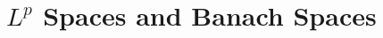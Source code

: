 \documentclass[../../main.tex]{subfiles}
\begin{document}
\chapter{\(L^p\) Spaces and Banach Spaces}
\end{document}
